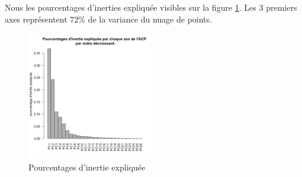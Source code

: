 \documentclass[a4paper,11pt,oneside,roman]{article}
\begin{document}
    Nous les pourcentages d'inerties expliquée visibles sur la figure \ref{fig_acp}. 
    Les 3 premiers axes représentent $72\%$ de la variance du nuage de points.
    \begin{figure}
        \centering
        \includegraphics[width=0.5\textwidth]{imgs/acp.png}
        \caption{Pourcentages d'inertie expliquée}
        \label{fig_acp}
    \end{figure}
\end{document}
